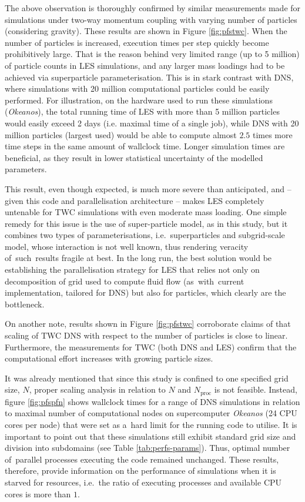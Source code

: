 \documentclass{pracamgren}
\begin{document}
The above observation is thoroughly confirmed by similar measurements made for simulations under two-way momentum coupling with varying number of particles (considering gravity).
These results are shown in Figure \ref{fig:pfstwc}.
When the number of particles is increased, execution times per step quickly become prohibitively large.
That is the reason behind very limited range (up to 5 million) of particle counts in LES simulations, and any larger mass loadings had to be achieved via superparticle parameterisation.
This is in stark contrast with DNS, where simulations with 20 million computational particles could be easily performed.
For illustration, on the hardware used to run these simulations (\emph{Okeanos}), the total running time of LES with more than 5 million particles would easily exceed 2 days (i.e. maximal time of a single job), while DNS with 20 million particles (largest used) would be able to compute almost $2.5$ times more time steps in the same amount of wallclock time.
Longer simulation times are beneficial, as they result in lower statistical uncertainty of the modelled parameters.

This result, even though expected, is much more severe than anticipated, and -- given this code and parallelisation architecture -- makes LES completely untenable for TWC simulations with even moderate mass loading.
One simple remedy for this issue is the use of super-particle model, as in this study, but it combines two types of parameterisations, i.e.~superparticles and subgrid-scale model, whose interaction is not well known, thus rendering veracity of~such~results fragile at best.
In the long run, the best solution would be establishing the parallelisation strategy for LES that relies not only on decomposition of grid used to compute fluid flow (as~with~current implementation, tailored for DNS) but also for particles, which clearly are the bottleneck.

On another note, results shown in Figure \ref{fig:pfstwc} corroborate claims of \textcite{Rosa2022} that scaling of TWC DNS with respect to the number of particles is close to linear.
Furthermore, the measurements for TWC (both DNS and LES) confirm that the computational effort increases with growing particle sizes.

\medskip

It was already mentioned that since this study is confined to one specified grid size, $N$, proper scaling analysis in relation to $N$ and $N_\text{proc}$ is not feasible.
Instead, figure \ref{fig:pfspfn} shows wallclock times for a range of DNS simulations in relation to maximal number of computational nodes on supercomputer \emph{Okeanos} (24 CPU cores per node) that were set as a~hard limit for the running code to utilise.
It is important to point out that these simulations still exhibit standard grid size and division into subdomains (see Table \ref{tab:perfs-params}).
Thus, optimal number of~parallel processes executing the code remained unchanged.
These results, therefore, provide information on the performance of simulations when it is starved for resources, i.e.~the ratio of executing processes and available CPU cores is more than $1$.
\end{document}
